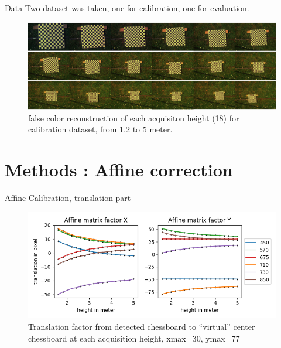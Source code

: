 \documentclass{beamer}
\begin{document}
		\begin{frame}{Data}
			Two dataset was taken, one for calibration, one for evaluation.
			\begin{figure}
				\includegraphics[width=\linewidth]{../figures/calibration-height.jpg}
				\caption{false color reconstruction of each acquisiton height (18) for calibration dataset, from 1.2 to 5 meter.}
			\end{figure}
		\end{frame}
	
	\section{Methods : Affine correction}
	
		\begin{frame}{Affine Calibration, translation part}
			\begin{figure}
				\includegraphics[width=0.7\linewidth]{../figures/affine-translation-height.png}
				\caption{Translation factor from detected chessboard to ``virtual'' center chessboard at each acquisition height, xmax=30, ymax=77}
			\end{figure}
		\end{frame}
\end{document}
